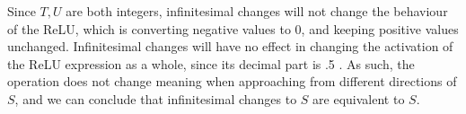 \documentclass[12pt]{article}
\begin{document}
\begin{itemize}
        Since $T,U$ are both integers, infinitesimal changes will not change the behaviour of the ReLU, which is converting negative values to 0, and keeping positive values unchanged. Infinitesimal changes will have no effect in changing the activation of the ReLU expression as a whole, since its decimal part is .5 . As such, the operation does not change meaning when approaching from different directions of $S$, and we can conclude that infinitesimal changes to $S$ are equivalent to $S$.

    \end{itemize}
\end{document}
